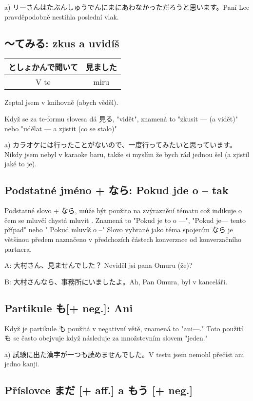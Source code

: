 a) リーさんはたぶんしゅうでんにまにあわなかっただろうと思います。Paní Lee pravděpodobně nestihla poslední vlak.

\subsection{〜てみる: zkus a uvidíš}

\begin{center}
\begin{tabular}{|| c | c ||}
としょかんで聞いて & 見ました\\
\hline
V te & miru \\
\end{tabular}
\end{center}
Zeptal jsem v knihovně (abych věděl).

Když se za te-formu slovesa dá 見る, "vidět", znamená to "zkusit --- (a vidět)" nebo "udělat --- a zjistit (co se stalo)"

a) カラオケには行ったことがないので、一度行ってみたいと思っています。Nikdy jsem nebyl v karaoke baru, takže si myslím že bych rád jednou šel (a zjistil jaké to je).


\subsection{Podstatné jméno + なら: Pokud jde o  -- tak}

Podstatné slovo  + なら, může být použito na zvýraznění tématu což indikuje o čem se mluvčí chystá mluvit . Znamená to "Pokud je to o  ---", "Pokud je--- tento případ" nebo " Pokud mluvíš o --"  Slovo vybrané jako téma spojením なら je většinou předem naznačeno v předchozích částech konverzace od konverzačního partnera.

A: 大村さん、見ませんでした？ Neviděl jsi pana Omuru (že)?


B: 大村さんなら、事務所にいましたよ。Ah, Pan Omura, byl v kanceláři.

\subsection{Partikule も[+ neg.]: Ani}
 Když je partikule も použitá v negativní větě, znamená to "ani---." Toto použití も se často obejvuje když následuje za množstevním slovem "jeden."

a) 試験に出た漢字が一つも読めませんでした。V testu jsem nemohl přečíst ani jedno kanji.


\subsection{Příslovce まだ [+ aff.] a もう [+ neg.]}

